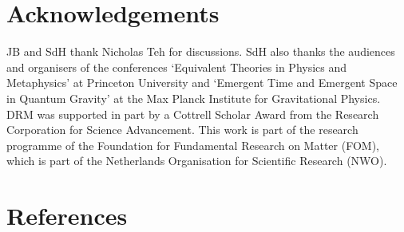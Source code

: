 \documentclass[12pt]{article}
\renewcommand{\^}[1]{\hat{#1}}
\begin{document}
\section*{Acknowledgements}

JB and SdH thank Nicholas Teh for discussions. SdH also thanks the audiences and organisers of the conferences `Equivalent Theories in Physics and Metaphysics' at Princeton University and `Emergent Time and Emergent Space in Quantum Gravity' at the Max Planck Institute for Gravitational Physics. 
DRM was supported in part by a Cottrell Scholar Award from the Research Corporation for Science Advancement. This work is part of the research programme of the Foundation for Fundamental Research on Matter (FOM), which is part of the Netherlands Organisation for Scientific Research (NWO). 


\section*{References}
\end{document}
